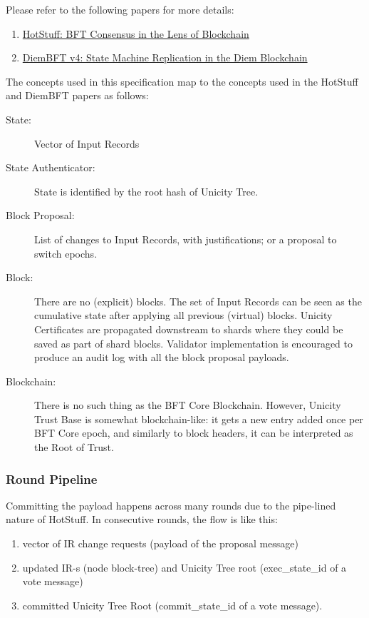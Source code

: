Please refer to the following papers for more details:

\begin{enumerate}
  \item \href{https://arxiv.org/abs/1803.05069}{HotStuff: BFT Consensus in the Lens of Blockchain}
  \item \href{https://developers.diem.com/papers/diem-consensus-state-machine-replication-in-the-diem-blockchain/2021-08-17.pdf}{DiemBFT v4: State Machine Replication in the Diem Blockchain}
\end{enumerate}

The concepts used in this specification map to the concepts used in the HotStuff and DiemBFT papers as follows:

\begin{description}
  \item[State:] Vector of Input Records
  \item[State Authenticator:] State is identified by the root hash of Unicity Tree.
  \item[Block Proposal:] List of changes to Input Records, with justifications; or a proposal to switch epochs.
  \item[Block:] There are no (explicit) blocks. The set of Input Records can be seen as the cumulative state after applying all previous (virtual) blocks. Unicity Certificates are propagated downstream to shards where they could be saved as part of shard blocks. Validator implementation is encouraged to produce an audit log with all the block proposal payloads.
  \item[Blockchain:] There is no such thing as the BFT Core Blockchain. However, Unicity Trust Base is somewhat blockchain-like: it gets a new entry added once per BFT Core epoch, and similarly to block headers, it can be interpreted as the Root of Trust.
\end{description}

\subsubsection{Round Pipeline}

Committing the payload happens across many rounds due to the pipe-lined nature of HotStuff. In consecutive rounds, the flow is like this:
\begin{enumerate}[nosep]
  \item vector of IR change requests (payload of the proposal message)
  \item updated IR-s (node block-tree) and Unicity Tree root (exec\_state\_id of a vote message)
  \item committed Unicity Tree Root (commit\_state\_id of a vote message).
\end{enumerate}

